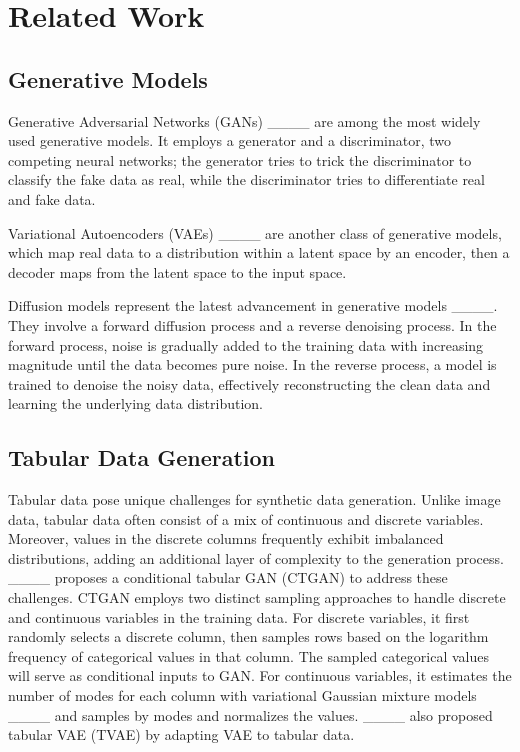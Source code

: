 \section{Related Work}
\label{sec:related}

\subsection{Generative Models} Generative Adversarial Networks (GANs) ____ are among the most widely used generative models. It employs a generator and a discriminator, two competing neural networks; the generator tries to trick the discriminator to classify the fake data as real, while the discriminator tries to differentiate real and fake data.

Variational Autoencoders (VAEs) ____ are another class of generative models, which map real data to a distribution within a latent space by an encoder, then a decoder maps from the latent space to the input space.  

Diffusion models represent the latest advancement in generative models ____. They involve a forward diffusion process and a reverse denoising process. In the forward process, noise is gradually added to the training data with increasing magnitude until the data becomes pure noise. In the reverse process, a model is trained to denoise the noisy data, effectively reconstructing the clean data and learning the underlying data distribution.

\subsection{Tabular Data Generation}
Tabular data pose unique challenges for synthetic data generation. Unlike image data, tabular data often consist of a mix of continuous and discrete variables. Moreover, values in the discrete columns frequently exhibit imbalanced distributions, adding an additional layer of complexity to the generation process. ____ proposes a conditional tabular GAN (CTGAN) to address these challenges. CTGAN employs two distinct sampling approaches to handle discrete and continuous variables in the training data. For discrete variables, it first randomly selects a discrete column, then samples rows based on the logarithm frequency of categorical values in that column. The sampled categorical values will serve as conditional inputs to GAN. For continuous variables, it estimates the number of modes for each column with variational Gaussian mixture models ____ and samples by modes and normalizes the values. ____ also proposed tabular VAE (TVAE) by adapting VAE to tabular data.

